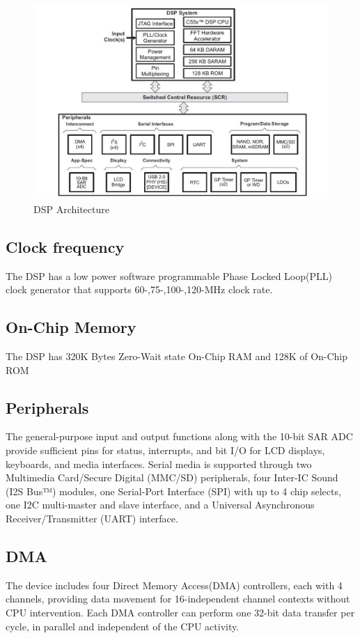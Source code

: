 \begin{figure}[h]
	\centering
	\includegraphics[scale = 0.75 ]{C5515_arch.JPG}
	\caption{DSP Architecture\label{C5515 Architecture}}
\end{figure} 
\subsection{Clock frequency}The DSP has a low power software programmable Phase Locked Loop(PLL) clock generator that  supports 60-,75-,100-,120-MHz clock rate.  
\subsection{On-Chip Memory}The DSP has 320K Bytes Zero-Wait state On-Chip RAM and 128K of On-Chip ROM

\subsection{Peripherals} The general-purpose input and output functions along with the 10-bit SAR ADC provide sufficient pins for status, interrupts, and bit I/O for LCD displays, keyboards, and media interfaces. Serial media is supported through two Multimedia Card/Secure Digital (MMC/SD) peripherals, four Inter-IC Sound (I2S Bus™) modules, one Serial-Port Interface (SPI) with up to 4 chip selects, one I2C multi-master and slave interface, and a Universal Asynchronous Receiver/Transmitter (UART) interface. 

\subsection{DMA} The device includes four Direct Memory Access(DMA) controllers, each with 4 channels, providing data movement for 16-independent channel contexts without CPU intervention. Each DMA controller can perform one 32-bit data transfer per cycle, in parallel and independent of the CPU activity.


